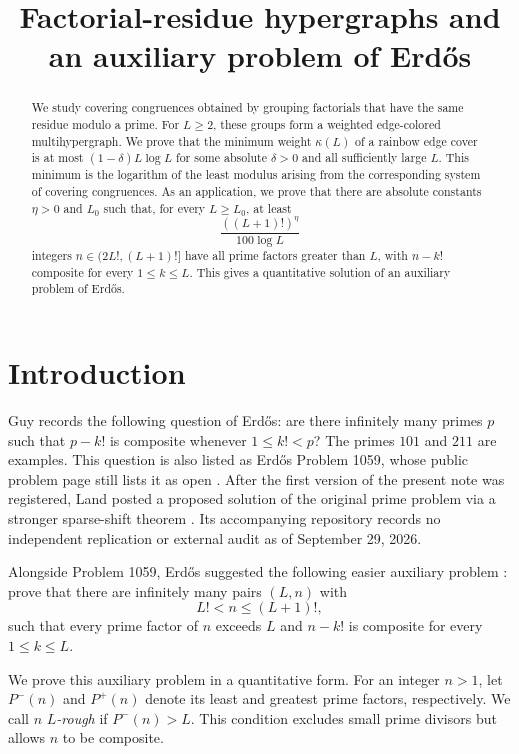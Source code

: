 \documentclass[11pt]{amsart}
\title[Factorial-residue hypergraphs]
{Factorial-residue hypergraphs and an auxiliary problem of Erd\H{o}s}
\author{}
\date{}
\theoremstyle{definition}
\theoremstyle{remark}
\begin{document}
\begin{abstract}
We study covering congruences obtained by grouping factorials that have the
same residue modulo a prime.  For $L\geq2$, these groups form a weighted
edge-colored multihypergraph.  We prove that the minimum weight
$\kappa(L)$ of a rainbow edge cover is at most $(1-\delta)L\log L$ for some
absolute $\delta>0$ and all sufficiently large $L$.  This minimum is the
logarithm of the least modulus arising from the corresponding system of
covering congruences.  As an application, we prove that there are absolute
constants $\eta>0$ and $L_0$ such that, for every $L\geq L_0$, at least
\[
\frac{((L+1)!)^\eta}{100\log L}
\]
integers $n\in(2L!,(L+1)!]$ have all prime factors greater than $L$, with
$n-k!$ composite for every $1\leq k\leq L$.  This gives a quantitative
solution of an auxiliary problem of Erd\H{o}s.
\end{abstract}

\maketitle

\section{Introduction}

Guy \cite[Problem A2]{Guy} records the following question of Erd\H{o}s: are
there infinitely many primes $p$ such that $p-k!$ is composite whenever
$1\leq k!<p$?  The primes $101$ and $211$ are examples.  This question is
also listed as Erd\H{o}s Problem 1059, whose public problem page still lists
it as open \cite{Bloom}.  After the first version of the present note was
registered, Land posted a proposed solution of the original prime problem via
a stronger sparse-shift theorem \cite{Land}.  Its accompanying repository
records no independent replication or external audit as of September 29, 2026.

Alongside Problem 1059, Erd\H{o}s suggested the following easier auxiliary
problem \cite[Problem A2]{Guy}: prove that there are infinitely many pairs
$(L,n)$ with
\[
L!<n\leq(L+1)!,
\]
such that every prime factor of $n$ exceeds $L$ and $n-k!$ is composite for
every $1\leq k\leq L$.

We prove this auxiliary problem in a quantitative form.  For an integer
$n>1$, let $P^-(n)$ and $P^+(n)$ denote its least and greatest prime factors,
respectively.  We call $n$ \emph{$L$-rough} if $P^-(n)>L$.
This condition excludes small prime divisors but allows $n$ to be composite.
\end{document}

